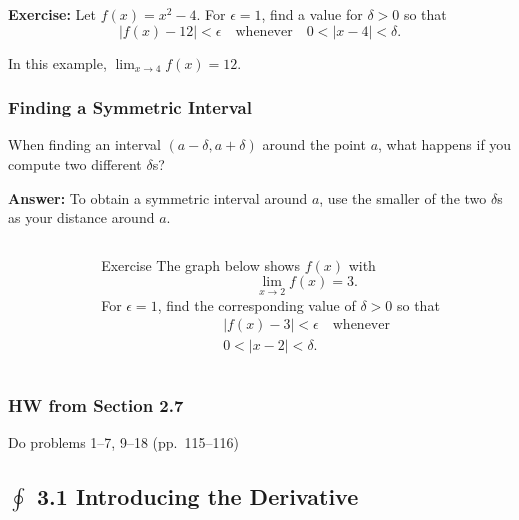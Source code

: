 \documentclass[14pt]{beamer}
\begin{document}
\begin{frame}
\frametitle{}
{\bf Exercise:}
Let $f(x)=x^2-4$.  For $\epsilon=1$, find a value for $\delta>0$ so that 
\[|f(x)-12|<\epsilon \quad \text{whenever}\quad 0<|x-4|<\delta.\]

\vspace{1pc}
In this example,  $\displaystyle\lim_{x \to 4}f(x)=12.$  
\end{frame}

\begin{frame}
\frametitle{Finding a Symmetric Interval}
\begin{que}When finding an interval $(a-\delta, a+\delta)$ around the point $a$, what happens if you compute two different $\delta$s?\end{que}  

\vspace{1pc}
{\bf Answer:}  To obtain a symmetric interval around $a$, use the smaller of the two $\delta$s as your distance around $a$.
\end{frame}

\begin{frame}
\begin{columns}[T]
	\begin{column}{.5\textwidth}
		\begin{block}
		\end{block}
	\end{column}
	\begin{column}{.5\textwidth}
		\begin{block}
		{Exercise} \footnotesize The graph below shows $f(x)$ with 
		\[\lim_{x \to 2}f(x)=3.\] 
		For $\epsilon=1$, find the corresponding value of $\delta>0$ so that
		\begin{multline*}|f(x)-3|<\epsilon\quad\text{whenever} \\
			0<|x-2|<\delta.\end{multline*}  
		\end{block}
	\end{column}
\end{columns}
\end{frame}

\begin{frame}
\frametitle{HW from Section 2.7}
Do problems 1--7, 9--18 (pp.\ 115--116)
\end{frame}

\subsection[3.1 Introducing the Derivative]{$\oint$ 3.1 Introducing the Derivative}
\end{document}

